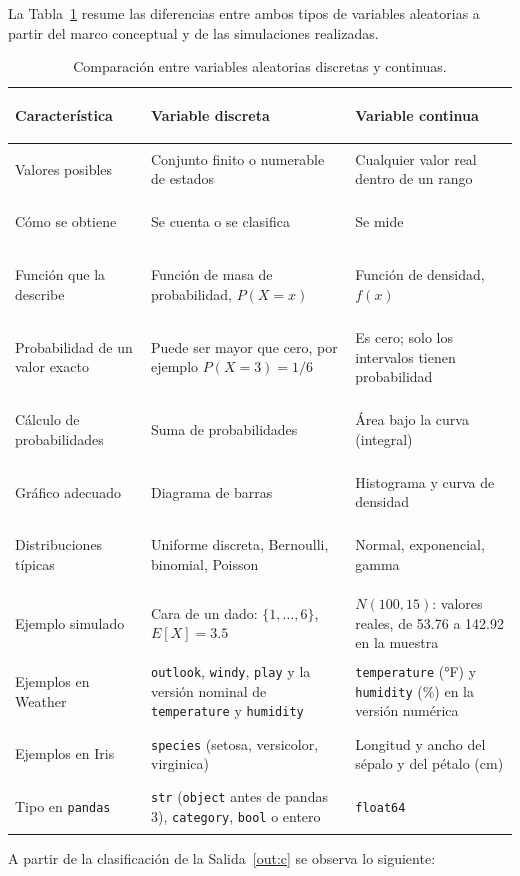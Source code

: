 \documentclass[11pt,letterpaper]{article}
\begin{document}
La Tabla~\ref{tab:comparativa} resume las diferencias entre ambos tipos de variables aleatorias a partir del marco conceptual y de las simulaciones realizadas.

\begin{table}[htbp]
\centering
\caption{Comparación entre variables aleatorias discretas y continuas.}
\label{tab:comparativa}
\small
\begin{tabular}{>{\bfseries\raggedright\arraybackslash}p{2.9cm}>{\raggedright\arraybackslash}p{5.9cm}>{\raggedright\arraybackslash}p{5.9cm}}
\hline
\textbf{Característica} & \textbf{Variable discreta} & \textbf{Variable continua} \\
\hline
Valores posibles & Conjunto finito o numerable de estados & Cualquier valor real dentro de un rango \\
Cómo se obtiene & Se cuenta o se clasifica & Se mide \\
Función que la describe & Función de masa de probabilidad, $P(X = x)$ & Función de densidad, $f(x)$ \\
Probabilidad de un valor exacto & Puede ser mayor que cero, por ejemplo $P(X = 3) = 1/6$ & Es cero; solo los intervalos tienen probabilidad \\
Cálculo de probabilidades & Suma de probabilidades & Área bajo la curva (integral) \\
Gráfico adecuado & Diagrama de barras & Histograma y curva de densidad \\
Distribuciones típicas & Uniforme discreta, Bernoulli, binomial, Poisson & Normal, exponencial, gamma \\
Ejemplo simulado & Cara de un dado: $\{1, \ldots, 6\}$, $E[X] = 3.5$ & $N(100, 15)$: valores reales, de 53.76 a 142.92 en la muestra \\
Ejemplos en Weather & \texttt{outlook}, \texttt{windy}, \texttt{play} y la versión nominal de \texttt{temperature} y \texttt{humidity} & \texttt{temperature} (°F) y \texttt{humidity} (\%) en la versión numérica \\
Ejemplos en Iris & \texttt{species} (setosa, versicolor, virginica) & Longitud y ancho del sépalo y del pétalo (cm) \\
Tipo en \texttt{pandas} & \texttt{str} (\texttt{object} antes de pandas 3), \texttt{category}, \texttt{bool} o entero & \texttt{float64} \\
\hline
\end{tabular}
\end{table}

A partir de la clasificación de la Salida~\ref{out:c} se observa lo siguiente:
\end{document}
